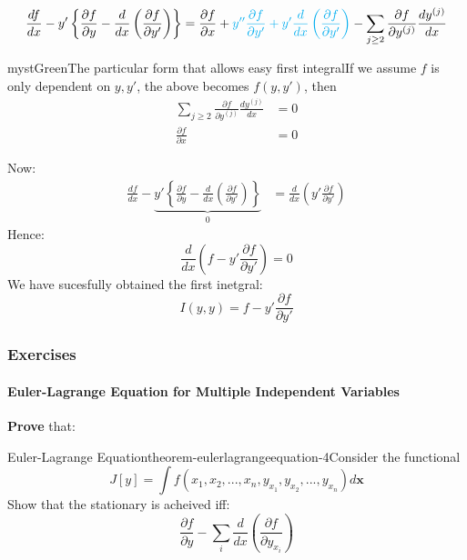 \begin{equation}
\frac{df}{dx}-y'\left\{\frac{\partial f}{\partial y} - \frac{d}{dx}\left( \frac{\partial f}{\partial y'}\right)\right\} =\frac{\partial f}{\partial x} + \textcolor{cyan}{y''\frac{\partial f}{\partial y'}+ y'\frac{d}{dx}\left( \frac{\partial f}{\partial y'}\right)}-\sum_{j\geq 2}\frac{\partial f}{\partial y^{(j)}}\frac{dy^{(j)}}{dx}
\end{equation}

\begin{mystadmonition}{mystGreen}{The particular form that allows easy first integral}If we assume $f$ is only dependent on $y,y'$, the above becomes $f(y,y')$, then
\begin{equation}
\begin{aligned}
\sum_{j\geq 2}\frac{\partial f}{\partial y^{(j)}}\frac{dy^{(j)}}{dx} &= 0\\ 
\frac{\partial f}{\partial x} &=0
\end{aligned}
\end{equation}

\end{mystadmonition}
Now:
\begin{equation}
\begin{aligned}
\frac{df}{dx}-\underbrace{y'\left\{\frac{\partial f}{\partial y} - \frac{d}{dx}\left( \frac{\partial f}{\partial y'}\right)\right\}}_{0}&= \frac{d}{dx}\left(y'\frac{\partial f}{\partial y'}\right)
\end{aligned}
\end{equation}
Hence:
\begin{equation}
\frac{d}{dx}\left(f-y'\frac{\partial f}{\partial y'}\right)=0
\end{equation}
We have sucesfully obtained the first inetgral:
\begin{equation}
I(y,y)=f-y'\frac{\partial f}{\partial y'}
\end{equation}

\subsubsection{Exercises}

\paragraph{Euler-Lagrange Equation for Multiple Independent Variables}

\textbf{Prove} that:

\begin{mystthmtheorem}{Euler-Lagrange Equation}{theorem-eulerlagrangeequation-4}Consider the functional
\begin{equation}
J[y]=\int f(x_1,x_2,...,x_n,y_{x_1},y_{x_2},...,y_{x_n})d\mathbf{x}
\end{equation}
Show that the stationary is acheived iff:
\begin{equation}
\frac{\partial f}{\partial y} - \sum_{i}\frac{d}{dx}\left(\frac{\partial f}{\partial y_{x_i}}\right)
\end{equation}

\end{mystthmtheorem}

